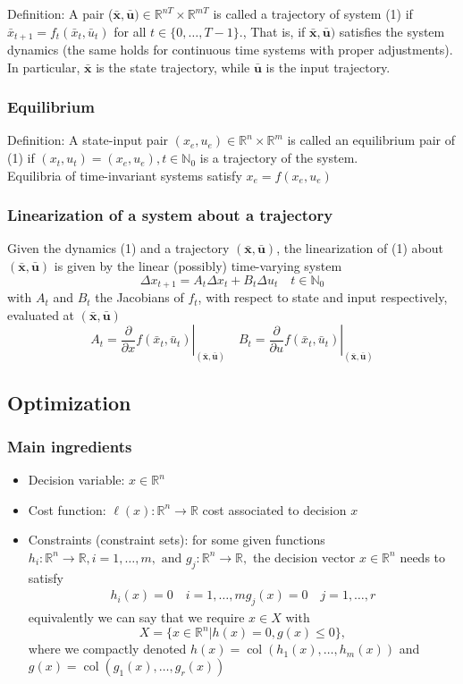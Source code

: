 \documentclass{book}
\newcommand\at[2]{\left.#1\right|_{#2}}
\DeclareMathOperator{\col}{col}
\newcommand{\R}{\mathbb{R}}
\newcommand{\N}{\mathbb{N}}
\begin{document}
Definition: A pair ($\bar{\mathbf{x}},\bar{\mathbf{u}})\in\R^{nT} \times \R^{mT}$ is called a trajectory of system (1) %
if $\bar{x}_{t+1}=f_t(\bar{x}_t,\bar{u}_t)$ for all $t\in\{0,\dots,T-1\}$., That is, if $\bar{\mathbf{x}},\bar{\mathbf{u}})$ satisfies the system dynamics (the same holds for continuous time systems with proper adjustments). In particular, $\bar{\mathbf{x}}$ is the state trajectory, while $\bar{\mathbf{u}}$ is the input trajectory.

\subsubsection{Equilibrium}
Definition: A state-input pair $(x_e,u_e)\in\R^n\times\R^m$ is called an equilibrium pair of (1) %
if $(x_t,u_t)=(x_e,u_e),t\in\N_0$ is a trajectory of the system. \\
Equilibria of time-invariant systems satisfy $x_e=f(x_e,u_e)$

\subsubsection{Linearization of a system about a trajectory}
Given the dynamics (1)%
and a trajectory $(\bar{\mathbf{x}},\bar{\mathbf{u}})$, the linearization of (1) about $(\bar{\mathbf{x}},\bar{\mathbf{u}})$ is given by the linear (possibly) time-varying system 
\[
    \Delta x_{t+1} = A_t\Delta x_t + B_t \Delta u_t \quad t\in\N_0
\]
with $A_t$ and $B_t$ the Jacobians of $f_t$, with respect to state and input respectively, evaluated at $(\bar{\mathbf{x}},\bar{\mathbf{u}})$
\[
A_t = \at{\displaystyle\frac{\partial}{\partial x}f(\bar{x}_t,\bar{u}_t)}{(\bar{\mathbf{x}},\bar{\mathbf{u}})} \quad B_t = \at{\displaystyle\frac{\partial}{\partial u}f(\bar{x}_t,\bar{u}_t)}{(\bar{\mathbf{x}},\bar{\mathbf{u}})}
\]

\subsection{Optimization}
\subsubsection{Main ingredients}
\begin{itemize}
    \item Decision variable: $x\in\R^n$ 
    \item Cost function: $\ell(x):\R^n\to\R$ cost associated to decision $x$
        \item Constraints (constraint sets): for some given functions $h_i:\R^n\to\R, i=1,\dots,m, \text{ and } g_j:\R^n\to\R,$ the decision vector $x\in\R^n$ needs to satisfy 
            \begin{gather*}
                h_i(x)=0 \quad i=1,\dots,m
                g_j(x)=0 \quad j=1,\dots,r
            \end{gather*}
        equivalently we can say that we require $x\in X$ with 
        \[
            X=\{x\in\R^n|h(x)=0, g(x)\leq 0\},
        \]
        where we compactly denoted $h(x)=\col(h_1(x),\dots,h_m(x))$ and $g(x) = \col(g_1(x),\dots,g_r(x))$
\end{itemize}
\end{document}

